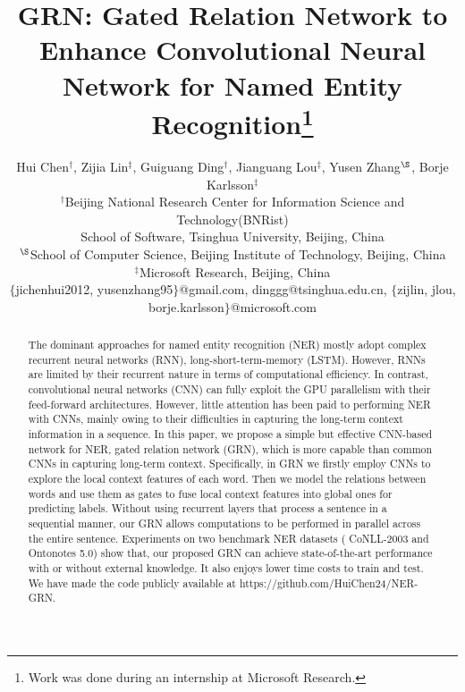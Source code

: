 \documentclass[letterpaper]{article} \usepackage{aaai19}  \usepackage{times}  \usepackage{helvet}  \usepackage{courier}  \usepackage{url}  \usepackage{graphicx}  \usepackage{amsmath}
\newcommand{\eg}{\text{e.g.,}}
\newcommand{\ie}{\text{i.e.,}}
\newcommand{\GRN}{GRN}
\begin{document}
\title{\GRN{}: Gated Relation Network to Enhance Convolutional Neural Network for Named Entity Recognition\thanks{Work was done during an internship at Microsoft Research.}}
\author{
Hui Chen$^{\dag}$, Zijia Lin$^\ddag$, Guiguang Ding$^{\dag}$, Jianguang Lou$^\ddag$, Yusen Zhang$^\S$, Borje Karlsson$^\ddag$ \\
$^\dag$Beijing National Research Center for Information Science and Technology(BNRist) \\
School of Software, Tsinghua University, Beijing, China \\
$^\S$School of Computer Science, Beijing Institute of Technology, Beijing, China\\
$^\ddag$Microsoft Research, Beijing, China \\
$\{$jichenhui2012, yusenzhang95$\}$@gmail.com, dinggg@tsinghua.edu.cn, $\{$zijlin, jlou, borje.karlsson$\}$@microsoft.com
}
\maketitle
\begin{abstract}
The dominant approaches for named entity recognition (NER) mostly adopt complex recurrent neural networks (RNN), \eg{} long-short-term-memory (LSTM). However, RNNs are limited by their recurrent nature in terms of computational efficiency. In contrast, convolutional neural networks (CNN) can fully exploit the GPU parallelism with their feed-forward architectures. However, little attention has been paid to performing NER with CNNs, mainly owing to their difficulties in capturing the long-term context information in a sequence. In this paper, we propose a simple but effective CNN-based network for NER, \ie{} gated relation network (\GRN{}), which is more capable than common CNNs in capturing long-term context. Specifically, in \GRN{} we firstly employ CNNs to explore the local context features of each word. Then we model the relations between words and use them as gates to fuse local context features into global ones for predicting labels. Without using recurrent layers that process a sentence in a sequential manner, our \GRN{} allows computations to be performed in parallel across the entire sentence. Experiments on two benchmark NER datasets (\ie{} CoNLL-2003 and Ontonotes 5.0) show that, our proposed \GRN{} can achieve state-of-the-art performance with or without external knowledge. It also enjoys lower time costs to train and test. We have made the code publicly available at https://github.com/HuiChen24/NER-GRN.
\end{abstract}
\end{document}
